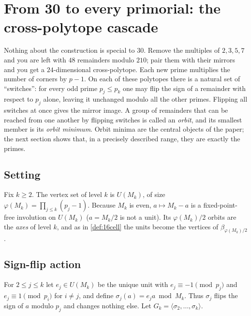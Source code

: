 \documentclass[11pt,a4paper]{article}
\theoremstyle{plain}
\theoremstyle{definition}
\theoremstyle{remark}
\begin{document}
\section{From 30 to every primorial: the cross-polytope cascade}\label{sec:cascade}

\begin{plainwords}
Nothing about the construction is special to $30$. Remove the multiples of
$2,3,5,7$ and you are left with $48$ remainders modulo $210$; pair them with
their mirrors and you get a $24$-dimensional cross-polytope. Each new prime
multiplies the number of corners by $p-1$. On each of these polytopes there is
a natural set of ``switches'': for every odd prime $p_j\le p_k$ one may flip
the sign of a remainder with respect to $p_j$ alone, leaving it unchanged
modulo all the other primes. Flipping all switches at once gives the mirror
image. A group of remainders that can be reached from one another by flipping
switches is called an \emph{orbit}, and its smallest member is its
\emph{orbit minimum}. Orbit minima are the central objects of the paper; the
next section shows that, in a precisely described range, they are exactly the
primes.
\end{plainwords}

\subsection{Setting}
Fix $k\ge2$. The vertex set of level $k$ is $U(M_k)$, of size
$\varphi(M_k)=\prod_{j\le k}(p_j-1)$. Because $M_k$ is even, $a\mapsto M_k-a$
is a fixed-point-free involution on $U(M_k)$ ($a=M_k/2$ is not a unit). Its
$\varphi(M_k)/2$ orbits are the \emph{axes} of level $k$, and as in
\cref{def:16cell} the units become the vertices of $\beta_{\varphi(M_k)/2}$.

\subsection{Sign-flip action}
For $2\le j\le k$ let $e_j\in U(M_k)$ be the unique unit with
$e_j\equiv-1\pmod{p_j}$ and $e_j\equiv1\pmod{p_i}$ for $i\ne j$, and define
$\sigma_j(a)=e_ja\bmod M_k$. Thus $\sigma_j$ flips the sign of $a$ modulo
$p_j$ and changes nothing else. Let $G_k=\langle\sigma_2,\dots,\sigma_k\rangle$.
\end{document}
